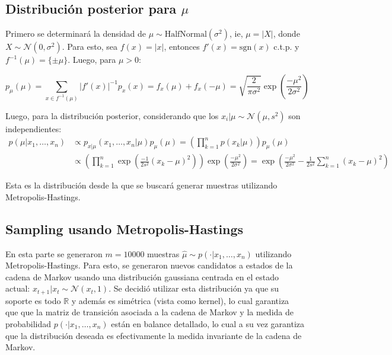 \documentclass{article}
\begin{document}
\subsection{Distribución posterior para $\mu$}

Primero se determinará la densidad de $\mu\sim\text{HalfNormal}(\sigma^2)$, ie, $\mu=|X|$, donde $X\sim\mathcal{N}(0,\sigma^2)$. Para esto, sea $f(x)=|x|$, entonces $f'(x)=\text{sgn}(x)$ c.t.p. y $f^{-1}(\mu)=\{\pm\mu\}$. Luego, para $\mu>0$:

\begin{equation*}
	p_\mu(\mu) = \sum_{x\in f^{-1}(\mu)} |f'(x)|^{-1} p_x(x) = f_x(\mu) + f_x(-\mu)=\sqrt{\frac{2}{\pi\sigma^2}} \exp\left(\frac{-\mu^2}{2\sigma^2}\right)
\end{equation*}

Luego, para la distribución posterior, considerando que los $x_i|\mu\sim\mathcal{N}(\mu,s^2)$ son independientes:
\begin{align*}
	p(\mu|x_1,\ldots,x_n) &\propto p_{x|\mu}(x_1,\ldots,x_n|\mu) p_\mu(\mu) = \left(\prod_{k=1}^n p(x_k|\mu)\right)p_\mu(\mu)\\
	&\propto \left(\prod_{k=1}^n \exp\left(\frac{-1}{2s^2}(x_k-\mu)^2\right)\right) \exp\left(\frac{-\mu^2}{2\sigma^2}\right)=\exp\left(\frac{-\mu^2}{2\sigma^2} - \frac{1}{2s^2} \sum_{k=1}^n (x_k-\mu)^2 \right)
\end{align*}

Esta es la distribución desde la que se buscará generar muestras utilizando Metropolis-Hastings.

\subsection{Sampling usando Metropolis-Hastings}

En esta parte se generaron $m=10000$ muestras $\hat{\mu} \sim p(\cdot|x_1,\ldots,x_n)$ utilizando Metropolis-Hastings. Para esto, se generaron nuevos candidatos a estados de la cadena de Markov usando una distribución gaussiana centrada en el estado actual: $x_{t+1}|x_t \sim \mathcal{N}(x_t, 1)$. Se decidió utilizar esta distribución ya que su soporte es todo $\mathbb{R}$ y además es simétrica (vista como kernel), lo cual garantiza que que la matriz de transición asociada a la cadena de Markov y la medida de probabilidad $p(\cdot|x_1,\ldots,x_n)$ están en balance detallado, lo cual a su vez garantiza que la distribución deseada es efectivamente la medida invariante de la cadena de Markov.
\end{document}
